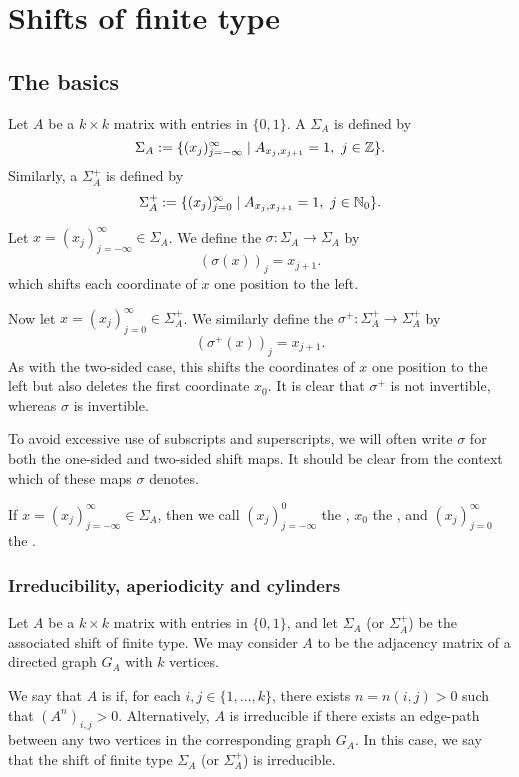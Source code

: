 \chapter{Shifts of finite type}
\section{The basics}
Let $A$ be a $k \times k$ matrix with entries in $\{0, 1\}$. A  $\Sigma_A$ is defined by
\[
	\Sigma_A := \{(x_j)_{j = -\infty}^\infty \mid A_{x_j, x_{j + 1}} = 1,\ j \in \mathbb{Z}\}.
\]
Similarly, a  $\Sigma_A^+$ is defined by
\[
	\Sigma_A^+ := \{(x_j)_{j = 0}^\infty \mid A_{x_j, x_{j + 1}} = 1,\ j \in \mathbb{N}_0\}.
\]

Let $x = (x_j)_{j = -\infty}^\infty \in \Sigma_A$. We define the  $\sigma : \Sigma_A \to \Sigma_A$ by
\[
	(\sigma(x))_j = x_{j + 1}.
\]
which shifts each coordinate of $x$ one position to the left.

Now let $x = (x_j)_{j = 0}^\infty \in \Sigma_A^+$. We similarly define the  $\sigma^+ : \Sigma_A^+ \to \Sigma_A^+$ by
\[
	(\sigma^+(x))_j = x_{j + 1}.
\]
As with the two-sided case, this shifts the coordinates of $x$ one position to the left but also deletes the first coordinate $x_0$. It is clear that $\sigma^+$ is not invertible, whereas $\sigma$ is invertible.

To avoid excessive use of subscripts and superscripts, we will often write $\sigma$ for both the one-sided and two-sided shift maps. It should be clear from the context which of these maps $\sigma$ denotes.

If $x = (x_j)_{j = -\infty}^\infty \in \Sigma_A$, then we call $(x_j)_{j = -\infty}^0$ the , $x_0$ the , and $(x_j)_{j = 0}^\infty$ the .

\subsection{Irreducibility, aperiodicity and cylinders}
Let $A$ be a $k \times k$ matrix with entries in $\{0, 1\}$, and let $\Sigma_A$ (or $\Sigma_A^+$) be the associated shift of finite type. We may consider $A$ to be the adjacency matrix of a directed graph $G_A$ with $k$ vertices.

We say that $A$ is  if, for each $i, j \in \{1, \dots, k\}$, there exists $n = n(i, j) > 0$ such that $(A^n)_{i, j} > 0$. Alternatively, $A$ is irreducible if there exists an edge-path between any two vertices in the corresponding graph $G_A$. In this case, we say that the shift of finite type $\Sigma_A$ (or $\Sigma_A^+$) is irreducible.

